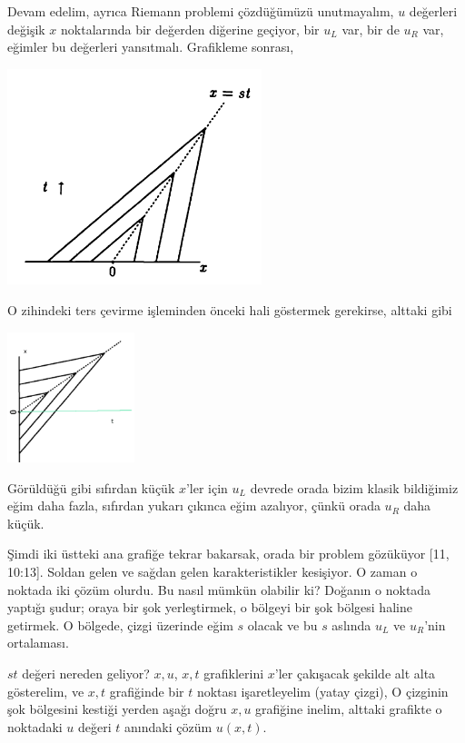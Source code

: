 \documentclass[12pt,fleqn]{article}\usepackage{../../common}
\begin{document}
Devam edelim, ayrıca Riemann problemi çözdüğümüzü unutmayalım, $u$ değerleri
değişik $x$ noktalarında bir değerden diğerine geçiyor, bir $u_L$ var, bir de
$u_R$ var, eğimler bu değerleri yansıtmalı. Grafikleme sonrası,

\includegraphics[width=20em]{compscieng_bpp50fv1_03.png}

O zihindeki ters çevirme işleminden önceki hali göstermek gerekirse, alttaki gibi

\includegraphics[width=10em]{compscieng_bpp50fv1_04.png}

Görüldüğü gibi sıfırdan küçük $x$'ler için $u_L$ devrede orada bizim klasik
bildiğimiz eğim daha fazla, sıfırdan yukarı çıkınca eğim azalıyor, çünkü
orada $u_R$ daha küçük.

Şimdi iki üstteki ana grafiğe tekrar bakarsak, orada bir problem gözüküyor
[11, 10:13]. Soldan gelen ve sağdan gelen karakteristikler kesişiyor. O zaman
o noktada iki çözüm olurdu. Bu nasıl mümkün olabilir ki? Doğanın o noktada
yaptığı şudur; oraya bir şok yerleştirmek, o bölgeyi bir şok bölgesi haline
getirmek. O bölgede, çizgi üzerinde eğim $s$ olacak ve bu $s$ aslında $u_L$
ve $u_R$'nin ortalaması.

$st$ değeri nereden geliyor? $x,u$, $x,t$ grafiklerini $x$'ler çakışacak şekilde
alt alta gösterelim, ve $x,t$ grafiğinde bir $t$ noktası işaretleyelim (yatay
çizgi), O çizginin şok bölgesini kestiği yerden aşağı doğru $x,u$ grafiğine
inelim, alttaki grafikte o noktadaki $u$ değeri $t$ anındaki çözüm $u(x,t)$.
\end{document}
